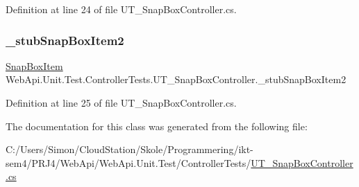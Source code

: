 Definition at line 24 of file U\+T\+\_\+\+Snap\+Box\+Controller.\+cs.

\mbox{\label{class_web_api_1_1_unit_1_1_test_1_1_controller_tests_1_1_u_t___snap_box_controller_a7c979410aa7898ce17acbe68706a898b}} 
\subsubsection{\texorpdfstring{\+\_\+stub\+Snap\+Box\+Item2}{\_stubSnapBoxItem2}}
{\footnotesize\ttfamily \mbox{\hyperlink{class_f_w_p_s_1_1_models_1_1_snap_box_item}{Snap\+Box\+Item}} Web\+Api.\+Unit.\+Test.\+Controller\+Tests.\+U\+T\+\_\+\+Snap\+Box\+Controller.\+\_\+stub\+Snap\+Box\+Item2\hspace{0.3cm}{\ttfamily [private]}}



Definition at line 25 of file U\+T\+\_\+\+Snap\+Box\+Controller.\+cs.



The documentation for this class was generated from the following file\+:\begin{DoxyCompactItemize}
\item 
C\+:/\+Users/\+Simon/\+Cloud\+Station/\+Skole/\+Programmering/ikt-\/sem4/\+P\+R\+J4/\+Web\+Api/\+Web\+Api.\+Unit.\+Test/\+Controller\+Tests/\mbox{\hyperlink{_u_t___snap_box_controller_8cs}{U\+T\+\_\+\+Snap\+Box\+Controller.\+cs}}\end{DoxyCompactItemize}
